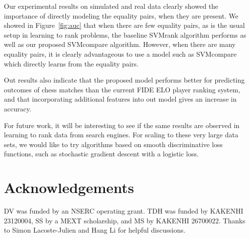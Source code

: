 \documentclass[twoside,11pt]{article}
\begin{document}
Our experimental results on simulated and real data clearly showed the
importance of directly modeling the equality pairs, when they are
present. We showed in Figure~\ref{fig:auc} that when there are few
equality pairs, as is the usual setup in learning to rank problems,
the baseline SVMrank algorithm performs as well as our proposed
SVMcompare algorithm. However, when there are many equality pairs, it
is clearly advantageous to use a model such as SVMcompare which
directly learns from the equality pairs.

Out results also indicate that the proposed model performs better for
predicting outcomes of chess matches than the current FIDE ELO player
ranking system, and that incorporating additional features into out
model gives an increase in accuracy.

For future work, it will be interesting to see if the same results are
observed in learning to rank data from search engines. For scaling to
these very large data sets, we would like to try algorithms based on
smooth discriminative loss functions, such as stochastic gradient
descent with a logistic loss.

\section*{Acknowledgements}
DV was funded by an NSERC operating grant. TDH was funded by KAKENHI 23120004, SS by a
MEXT scholarship, and MS by KAKENHI 26700022. 
Thanks to Simon Lacoste-Julien and Hang Li for helpful discussions.




\end{document}
